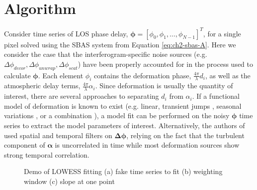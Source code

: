 \section{Algorithm}
Consider time series of LOS phase delay,  $ \bm{\phi} = \left[\phi_0, \phi_1, \ldots, \phi_{N-1} \right]^T $, for a single pixel solved using the SBAS system from Equation \eqref{eq:ch2-sbas-A}.
Here we consider the case that the interferogram-specific noise sources (e.g. $  \Delta \phi_{decor}, \Delta \phi_{unwrap}, \Delta \phi_{scat}  $) have been properly accounted for in the process used to calculate $ \bm{\phi} $.
Each element $\phi_i$ contains
the deformation phase, $\frac{4 \pi}{\lambda} d_i$, as well as the atmospheric delay terms, $\frac{4 \pi}{\lambda} \alpha_i$.
Since deformation is usually the quantity of interest, there are several approaches to separating $ d_i $ from $ \alpha_i $.
If a functional model of deformation is known to exist (e.g. linear, transient jumps \citep{Chen20142010SlowSlip, Fielding2017SurfaceDeformationNorth}, seasonal variations \citep{Murray2018ShortLivedPause}, or a combination \citep{Riel2018QuantifyingGroundDeformation}), a model fit can be performed on the noisy $ \bm{\phi} $ time series to extract the model parameters of interest.
Alternatively, the authors of \cite{Berardino2002NewAlgorithmSurface} used spatial and temporal filters on $\bm{\Delta \phi}$, relying on the fact that the turbulent component of $\bm{\alpha}$ is uncorrelated in time \citep{Emardson2003NeutralAtmosphericDelay} while most deformation sources show strong temporal correlation.



\begin{figure}
\centering
\caption[Demo of LOWESS fitting]{
	Demo of LOWESS fitting
	(a) fake time series to fit
	(b) weighting window
	(c) slope at one point
}
\label{fig:ch5-algo-demo}
\end{figure}


